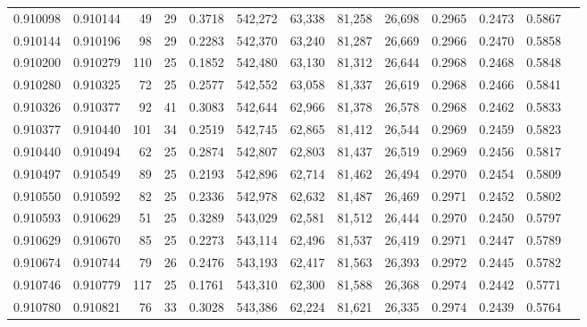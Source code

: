 \begin{tabular}{rrrrrrrrrrrrr}
0.910098 & 0.910144 &    49 &  29 &                                     0.3718 & 542,272 &  63,338 &  81,258 &  26,698 & 0.2965 & 0.2473 & 0.5867 \\
0.910144 & 0.910196 &    98 &  29 &                                     0.2283 & 542,370 &  63,240 &  81,287 &  26,669 & 0.2966 & 0.2470 & 0.5858 \\
0.910200 & 0.910279 &   110 &  25 &                                     0.1852 & 542,480 &  63,130 &  81,312 &  26,644 & 0.2968 & 0.2468 & 0.5848 \\
0.910280 & 0.910325 &    72 &  25 &                                     0.2577 & 542,552 &  63,058 &  81,337 &  26,619 & 0.2968 & 0.2466 & 0.5841 \\
0.910326 & 0.910377 &    92 &  41 &                                     0.3083 & 542,644 &  62,966 &  81,378 &  26,578 & 0.2968 & 0.2462 & 0.5833 \\
0.910377 & 0.910440 &   101 &  34 &                                     0.2519 & 542,745 &  62,865 &  81,412 &  26,544 & 0.2969 & 0.2459 & 0.5823 \\
0.910440 & 0.910494 &    62 &  25 &                                     0.2874 & 542,807 &  62,803 &  81,437 &  26,519 & 0.2969 & 0.2456 & 0.5817 \\
0.910497 & 0.910549 &    89 &  25 &                                     0.2193 & 542,896 &  62,714 &  81,462 &  26,494 & 0.2970 & 0.2454 & 0.5809 \\
0.910550 & 0.910592 &    82 &  25 &                                     0.2336 & 542,978 &  62,632 &  81,487 &  26,469 & 0.2971 & 0.2452 & 0.5802 \\
0.910593 & 0.910629 &    51 &  25 &                                     0.3289 & 543,029 &  62,581 &  81,512 &  26,444 & 0.2970 & 0.2450 & 0.5797 \\
0.910629 & 0.910670 &    85 &  25 &                                     0.2273 & 543,114 &  62,496 &  81,537 &  26,419 & 0.2971 & 0.2447 & 0.5789 \\
0.910674 & 0.910744 &    79 &  26 &                                     0.2476 & 543,193 &  62,417 &  81,563 &  26,393 & 0.2972 & 0.2445 & 0.5782 \\
0.910746 & 0.910779 &   117 &  25 &                                     0.1761 & 543,310 &  62,300 &  81,588 &  26,368 & 0.2974 & 0.2442 & 0.5771 \\
0.910780 & 0.910821 &    76 &  33 &                                     0.3028 & 543,386 &  62,224 &  81,621 &  26,335 & 0.2974 & 0.2439 & 0.5764 \\

\end{tabular}
